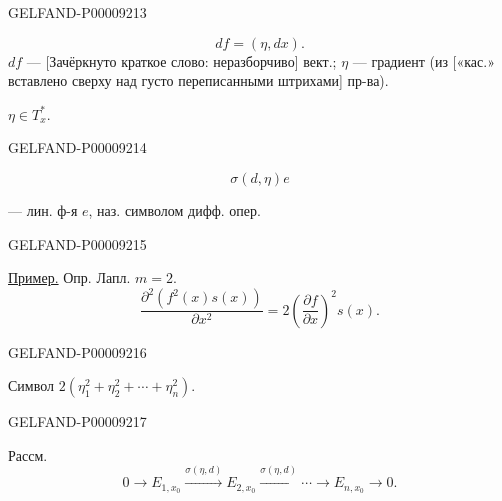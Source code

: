 \begin{GelfandAdjacentEvidence}{GELFAND-P000092}{13}

\begin{equation*}df=(\eta,dx).\end{equation*}
$df$ — [Зачёркнуто краткое слово: неразборчиво] вект.; $\eta$ — градиент (из [«кас.» вставлено сверху над густо переписанными штрихами] пр-ва).

$\eta\in T_x^*$.
\end{GelfandAdjacentEvidence}
\begin{GelfandAdjacentEvidence}{GELFAND-P000092}{14}

\begin{equation*}\sigma(d,\eta)e\end{equation*}

— лин. ф-я $e$, наз. символом дифф. опер.
\end{GelfandAdjacentEvidence}
\begin{GelfandAdjacentEvidence}{GELFAND-P000092}{15}

\underline{Пример.} Опр. Лапл. $m=2$.
\begin{equation*}
\frac{\partial^2(f^2(x)s(x))}{\partial x^2}
=2\left(\frac{\partial f}{\partial x}\right)^2s(x).
\end{equation*}
\end{GelfandAdjacentEvidence}
\begin{GelfandAdjacentEvidence}{GELFAND-P000092}{16}

Символ $2(\eta_1^2+\eta_2^2+\cdots+\eta_n^2)$.
\end{GelfandAdjacentEvidence}
\begin{GelfandAdjacentEvidence}{GELFAND-P000092}{17}

Рассм.
\begin{equation*}
0\longrightarrow E_{1,x_0}\overset{\sigma(\eta,d)}{\longrightarrow}E_{2,x_0}
\overset{\sigma(\eta,d)}{\longrightarrow}\cdots\longrightarrow E_{n,x_0}\longrightarrow0.
\end{equation*}
\end{GelfandAdjacentEvidence}
